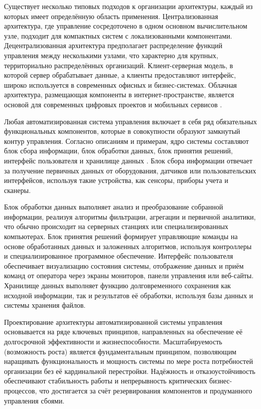 \documentclass{SibFU-docs}
\begin{document}
Существует несколько типовых подходов к организации архитектуры, каждый из которых имеет определённую область применения. Централизованная архитектура, где управление сосредоточено в одном основном вычислительном узле, подходит для компактных систем с локализованными компонентами. Децентрализованная архитектура предполагает распределение функций управления между несколькими узлами, что характерно для крупных, территориально распределённых организаций. Клиент-серверная модель, в которой сервер обрабатывает данные, а клиенты предоставляют интерфейс, широко используется в современных офисных и бизнес-системах. Облачная архитектура, размещающая компоненты в интернет-пространстве, является основой для современных цифровых проектов и мобильных сервисов \cite{rasp_control_system}.


Любая автоматизированная система управления включает в себя ряд обязательных функциональных компонентов, которые в совокупности образуют замкнутый контур управления. Согласно описаниям и примерам, ядро системы составляют блок сбора информации, блок обработки данных, блок принятия решений, интерфейс пользователя и хранилище данных \cite{rasp_control_system}. Блок сбора информации отвечает за получение первичных данных от оборудования, датчиков или пользовательских интерфейсов, используя такие устройства, как сенсоры, приборы учета и сканеры.

Блок обработки данных выполняет анализ и преобразование собранной информации, реализуя алгоритмы фильтрации, агрегации и первичной аналитики, что обычно происходит на серверных станциях или специализированных компьютерах. Блок принятия решений формирует управляющие команды на основе обработанных данных и заложенных алгоритмов, используя контроллеры и специализированное программное обеспечение. Интерфейс пользователя обеспечивает визуализацию состояния системы, отображение данных и приём команд от оператора через экраны мониторов, панели управления или веб-сайты. Хранилище данных выполняет функцию долговременного сохранения как исходной информации, так и результатов её обработки, используя базы данных и системы хранения файлов.


Проектирование архитектуры автоматизированной системы управления основывается на ряде ключевых принципов, направленных на обеспечение её долгосрочной эффективности и жизнеспособности. Масштабируемость (возможность роста) является фундаментальным принципом, позволяющим наращивать функциональность и мощность системы по мере роста потребностей организации без её кардинальной перестройки. Надёжность и отказоустойчивость обеспечивают стабильность работы и непрерывность критических бизнес-процессов, что достигается за счёт резервирования компонентов и продуманного управления сбоями.
\end{document}
